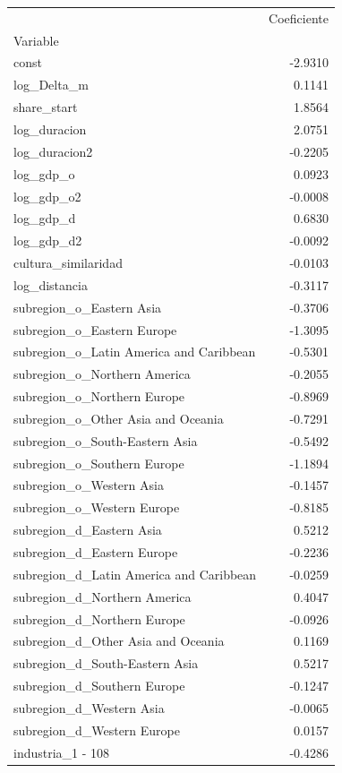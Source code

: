 \begin{tabular}{lr}
\toprule
 & Coeficiente \\
Variable &  \\
\midrule
const & -2.9310 \\
log_Delta_m & 0.1141 \\
share_start & 1.8564 \\
log_duracion & 2.0751 \\
log_duracion2 & -0.2205 \\
log_gdp_o & 0.0923 \\
log_gdp_o2 & -0.0008 \\
log_gdp_d & 0.6830 \\
log_gdp_d2 & -0.0092 \\
cultura_similaridad & -0.0103 \\
log_distancia & -0.3117 \\
subregion_o_Eastern Asia & -0.3706 \\
subregion_o_Eastern Europe & -1.3095 \\
subregion_o_Latin America and Caribbean & -0.5301 \\
subregion_o_Northern America & -0.2055 \\
subregion_o_Northern Europe & -0.8969 \\
subregion_o_Other Asia and Oceania & -0.7291 \\
subregion_o_South-Eastern Asia & -0.5492 \\
subregion_o_Southern Europe & -1.1894 \\
subregion_o_Western Asia & -0.1457 \\
subregion_o_Western Europe & -0.8185 \\
subregion_d_Eastern Asia & 0.5212 \\
subregion_d_Eastern Europe & -0.2236 \\
subregion_d_Latin America and Caribbean & -0.0259 \\
subregion_d_Northern America & 0.4047 \\
subregion_d_Northern Europe & -0.0926 \\
subregion_d_Other Asia and Oceania & 0.1169 \\
subregion_d_South-Eastern Asia & 0.5217 \\
subregion_d_Southern Europe & -0.1247 \\
subregion_d_Western Asia & -0.0065 \\
subregion_d_Western Europe & 0.0157 \\
industria_1 - 108 & -0.4286 \\

\end{tabular}

